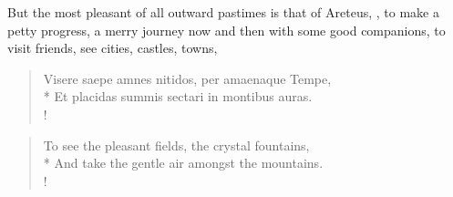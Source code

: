 {But the most pleasant of all outward pastimes is that of Areteus, , to make a petty progress, a merry journey now and then with some good companions, to visit friends, see cities, castles, towns,

\begin{latin}
\begin{verse}%
Visere saepe amnes nitidos, per amaenaque Tempe,\\*
Et placidas summis sectari in montibus auras.\\!
\end{verse}%
\end{latin}



\begin{verse}%
To see the pleasant fields, the crystal fountains,\\*
And take the gentle air amongst the mountains.\\!
\end{verse}%

}
